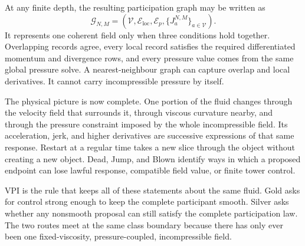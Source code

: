 At any finite depth, the resulting participation graph may be written as
\[
  \mathcal G_{N,M}
  =
  \left(
    \mathcal V,
    \mathcal E_{\mathrm{loc}},
    \mathcal E_p,
    \{J_a^{N,M}\}_{a\in\mathcal V}
  \right).
\]
It represents one coherent field only when three conditions hold together.
Overlapping records agree, every local record satisfies the required differentiated momentum and divergence rows, and every pressure value comes from the same global pressure solve.
A nearest-neighbour graph can capture overlap and local derivatives.
It cannot carry incompressible pressure by itself.

The physical picture is now complete.
One portion of the fluid changes through the velocity field that surrounds it, through viscous curvature nearby, and through the pressure constraint imposed by the whole incompressible field.
Its acceleration, jerk, and higher derivatives are successive expressions of that same response.
Restart at a regular time takes a new slice through the object without creating a new object.
Dead, Jump, and Blown identify ways in which a proposed endpoint can lose lawful response, compatible field value, or finite tower control.

VPI is the rule that keeps all of these statements about the same fluid.
Gold asks for control strong enough to keep the complete participant smooth.
Silver asks whether any nonsmooth proposal can still satisfy the complete participation law.
The two routes meet at the same class boundary because there has only ever been one fixed-viscosity, pressure-coupled, incompressible field.
